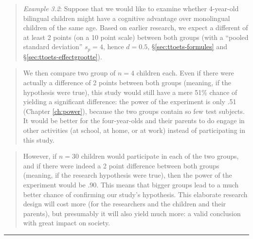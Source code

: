 \documentclass[
]{book}
\begin{document}
\begin{quote}
\emph{Example 3.2}: Suppose that we would like to examine whether 4-year-old bilingual children might have a cognitive advantage over monolingual children of the same age. Based on earlier research, we expect a different of at least 2 points (on a 10 point scale) between both groups (with a ``pooled standard deviation'' \(s_p=4\), hence \(d=0.5\), §\ref{sec:ttoets-formules} and §\ref{sec:ttoets-effectgrootte}).
\end{quote}

\begin{quote}
We then compare two group of \(n = 4\) children each. Even if there were actually a difference of 2 points between both groups (meaning, if the hypothesis were true), this study would still have a mere 51\% chance of yielding a significant difference: the power of the experiment is only .51 (Chapter \ref{ch:power}), because the two groups contain so few test subjects. It would be better for the four-year-olds and their parents to do engage in other activities (at school, at home, or at work) instead of participating in this study.
\end{quote}

\begin{quote}
However, if \(n = 30\) children would participate in each of the two groups, and if there were indeed a 2 point difference between both groups (meaning, if the research hypothesis were true), then the power of the experiment would be .90. This means that bigger groups lead to a much better chance of confirming our study's hypothesis. This elaborate research design will cost more (for the researchers and the children and their parents), but presumably it will also yield much more: a valid conclusion with great impact on society.
\end{quote}

\begin{center}\rule{0.5\linewidth}{0.5pt}\end{center}
\end{document}
